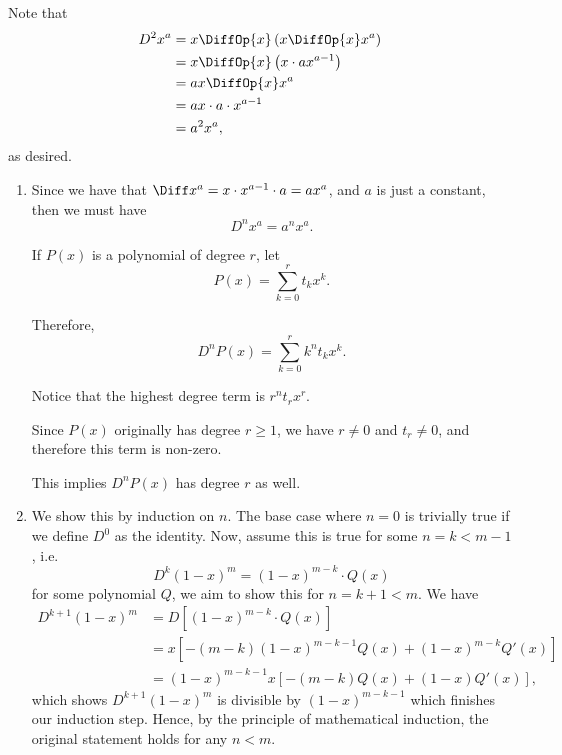 \Question{\currfilebase}

Note that
\begin{align*}
    D^2 x^a & = x \DiffOp{x} \left(x \DiffOp{x} x^a\right)   \\
            & = x \DiffOp{x} \left(x \cdot ax^{a - 1}\right) \\
            & = ax \DiffOp{x} x^a                            \\
            & = ax \cdot a \cdot x^{a - 1}                   \\
            & = a^2 x^a,
\end{align*}
as desired.

\begin{enumerate}
    \item Since we have that \(\Diff x^a = x \cdot x^{a - 1} \cdot a = a x^a\), and \(a\) is just a constant, then we must have
          \[
              D^n x^a = a^n x^a.
          \]

          If \(P(x)\) is a polynomial of degree \(r\), let
          \[
              P(x) = \sum_{k = 0}^{r} t_k x^k.
          \]

          Therefore,
          \[
              D^n P(x) = \sum_{k = 0}^{r} k^n t_k x^k.
          \]

          Notice that the highest degree term is \(r^n t_r x^r\).

          Since \(P(x)\) originally has degree \(r \geq 1\), we have \(r \neq 0\) and \(t_r \neq 0\), and therefore this term is non-zero.

          This implies \(D^n P(x)\) has degree \(r\) as well.

    \item We show this by induction on \(n\). The base case where \(n = 0\) is trivially true if we define \(D^0\) as the identity. Now, assume this is true for some \(n = k < m - 1\), i.e.
          \[
              D^{k} (1 - x)^m = (1 - x)^{m - k} \cdot Q(x)
          \]
          for some polynomial \(Q\), we aim to show this for \(n = k + 1 < m\). We have
          \begin{align*}
              D^{k + 1} (1 - x)^m & = D \left[(1 - x)^{m - k} \cdot Q(x)\right]                                \\
                                  & = x \left[-(m - k) (1 - x)^{m - k - 1} Q(x) + (1 - x)^{m - k} Q'(x)\right] \\
                                  & = (1 - x)^{m - k - 1} x\left[- (m - k) Q(x) + (1 - x) Q'(x)\right],
          \end{align*}
          which shows \(D^{k + 1} (1 - x)^m\) is divisible by \((1 - x)^{m - k - 1}\) which finishes our induction step. Hence, by the principle of mathematical induction, the original statement holds for any \(n < m\).


\end{enumerate}
